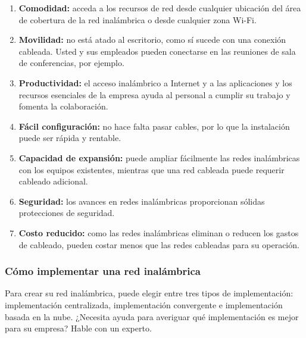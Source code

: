 \documentclass[12pt]{article}
\begin{document}
  \begin{enumerate}
    \item \textbf{Comodidad:} acceda a los recursos de red desde cualquier ubicación del área de cobertura de la red inalámbrica o desde cualquier zona Wi-Fi.
    \item \textbf{Movilidad:} no está atado al escritorio, como sí sucede con una conexión cableada. Usted y sus empleados pueden conectarse en las reuniones de sala de conferencias, por ejemplo.
    \item \textbf{Productividad:} el acceso inalámbrico a Internet y a las aplicaciones y los recursos esenciales de la empresa ayuda al personal a cumplir su trabajo y fomenta la colaboración.
    \item \textbf{Fácil configuración:} no hace falta pasar cables, por lo que la instalación puede ser rápida y rentable.
    \item \textbf{Capacidad de expansión:} puede ampliar fácilmente las redes inalámbricas con los equipos existentes, mientras que una red cableada puede requerir cableado adicional.
    \item \textbf{Seguridad:} los avances en redes inalámbricas proporcionan sólidas protecciones de seguridad.
    \item \textbf{Costo reducido:} como las redes inalámbricas eliminan o reducen los gastos de cableado, pueden costar menos que las redes cableadas para su operación.
  \end{enumerate}

  \subsubsection*{Cómo implementar una red inalámbrica}
  Para crear su red inalámbrica, puede elegir entre tres tipos de implementación: implementación centralizada, implementación convergente e implementación basada en la nube. ¿Necesita ayuda para averiguar qué implementación es mejor para su empresa? Hable con un experto.
\end{document}
